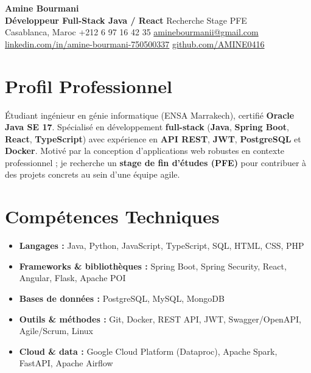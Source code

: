 \documentclass[10pt,a4paper]{article}
\newcommand{\PhotoPlaceholder}{%
  \fcolorbox{black!25}{black!3}{%
    \parbox[c][3.4cm][c]{2.6cm}{\centering\scriptsize\textcolor{black!45}{Photo}}%
  }%
}
\begin{document}
\noindent
\begin{minipage}[t]{0.17\textwidth}
  \PhotoPlaceholder
\end{minipage}%
\hfill
\begin{minipage}[t]{0.80\textwidth}
  {\LARGE\textbf{Amine Bourmani}}\\[5pt]
  \textbf{Développeur Full-Stack Java / React} \textbar{} Recherche Stage PFE\\[4pt]
  Casablanca, Maroc \textbar{} +212 6 97 16 42 35 \textbar{} \href{mailto:aminebourmanii@gmail.com}{aminebourmanii@gmail.com}\\[2pt]
  \href{https://linkedin.com/in/amine-bourmani-750500337}{linkedin.com/in/amine-bourmani-750500337}
  \textbar{}
  \href{https://github.com/AMINE0416}{github.com/AMINE0416}
\end{minipage}

\section*{Profil Professionnel}

Étudiant ingénieur en génie informatique (ENSA Marrakech), certifié \textbf{Oracle Java SE 17}.
Spécialisé en développement \textbf{full-stack} (\textbf{Java}, \textbf{Spring Boot}, \textbf{React}, \textbf{TypeScript}) avec expérience en
\textbf{API REST}, \textbf{JWT}, \textbf{PostgreSQL} et \textbf{Docker}.
Motivé par la conception d'applications web robustes en contexte professionnel ; je recherche un
\textbf{stage de fin d'études (PFE)} pour contribuer à des projets concrets au sein d'une équipe agile.

\section*{Compétences Techniques}

\begin{itemize}
  \item \textbf{Langages :} Java, Python, JavaScript, TypeScript, SQL, HTML, CSS, PHP
  \item \textbf{Frameworks \& bibliothèques :} Spring Boot, Spring Security, React, Angular, Flask, Apache POI
  \item \textbf{Bases de données :} PostgreSQL, MySQL, MongoDB
  \item \textbf{Outils \& méthodes :} Git, Docker, REST API, JWT, Swagger/OpenAPI, Agile/Scrum, Linux
  \item \textbf{Cloud \& data :} Google Cloud Platform (Dataproc), Apache Spark, FastAPI, Apache Airflow
\end{itemize}
\end{document}
